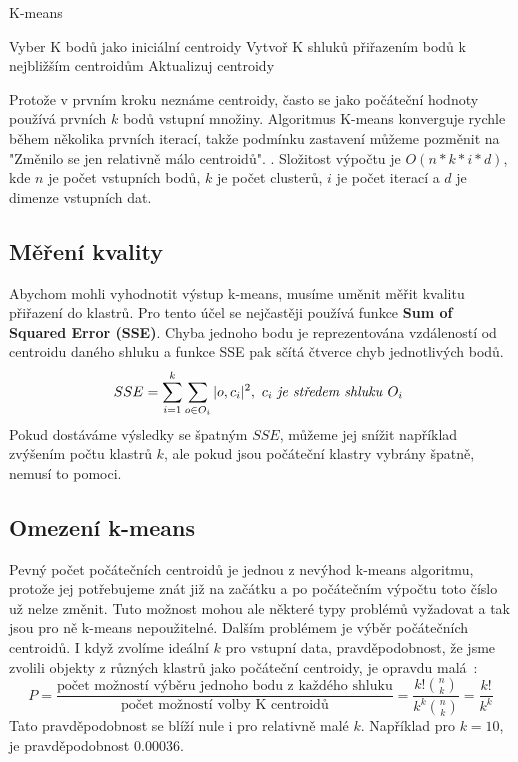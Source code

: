 \begin{algorithm}
\caption{K-means}\label{alg:kmeans}
\begin{algorithmic}[1]
\State Vyber K bodů jako iniciální centroidy
\Repeat
\State Vytvoř K shluků přiřazením bodů k nejbližším centroidům
\State Aktualizuj centroidy
\end{algorithmic}
\end{algorithm}

Protože v prvním kroku neznáme centroidy, často se jako počáteční hodnoty používá prvních $k$ bodů vstupní množiny. Algoritmus K-means konverguje rychle během několika prvních iterací, takže podmínku zastavení můžeme pozměnit na "Změnilo se jen relativně málo centroidů". \cite{Tan05}.
Složitost výpočtu je $O(n*k*i*d)$, kde $n$ je počet vstupních bodů, $k$ je počet clusterů, $i$ je počet iterací a $d$ je dimenze vstupních dat. \\

\subsection{Měření kvality}
Abychom mohli vyhodnotit výstup k-means, musíme uměnit měřit kvalitu přiřazení do klastrů. Pro tento účel se nejčastěji používá funkce \textbf{Sum of Squared Error (SSE)}. Chyba jednoho bodu je reprezentována vzdáleností od centroidu daného shluku a funkce SSE pak sčítá čtverce chyb jednotlivých bodů.
$$SSE = \sum^k_{i=1}\sum_{o \in O_i}|o,c_i|^2, \textrm{ $c_i$ \textit{je středem shluku} $O_i$ }$$
Pokud dostáváme výsledky se špatným $SSE$, můžeme jej snížit například zvýšením počtu klastrů $k$, ale pokud jsou počáteční klastry vybrány špatně, nemusí to pomoci.\\

\subsection{Omezení k-means}
Pevný počet počátečních centroidů je jednou z nevýhod k-means algoritmu, protože jej potřebujeme znát již na začátku a po počátečním výpočtu toto číslo už nelze změnit. Tuto možnost mohou ale některé typy problémů vyžadovat a tak jsou pro ně k-means nepoužitelné. Dalším problémem je výběr počátečních centroidů. I když zvolíme ideální $k$ pro vstupní data, pravděpodobnost, že jsme zvolili objekty z různých klastrů jako počáteční centroidy, je opravdu malá~\cite{Tan05}: $$P = \frac{\mbox{počet možností výběru jednoho bodu z každého shluku}}{\mbox{počet možností volby K centroidů}}=\frac{k!{n \choose k}}{k^k {n \choose k} }=\frac{k!}{k^k}$$ Tato pravděpodobnost se blíží nule i pro relativně malé $k$. Například pro $k=10$, je pravděpodobnost $0.00036$. \\

